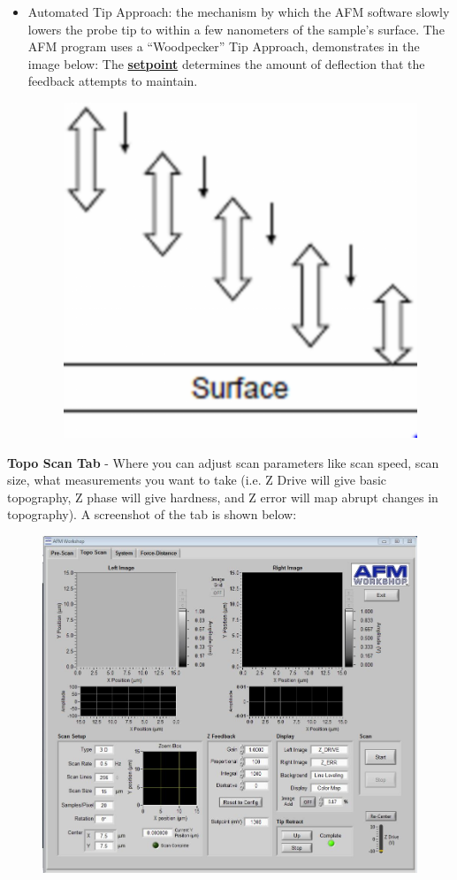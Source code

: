 \documentclass{../lab}
\begin{document}
\begin{itemize}
    \item Automated Tip Approach:  the mechanism by which the AFM software slowly lowers the probe tip to within a few nanometers of the sample's surface.  The AFM program uses a ``Woodpecker'' Tip Approach, demonstrates in the image below: The \href{http://experimentationlab.berkeley.edu/sites/default/files/AFMImages/VM\%203.3.\%20Avg\%20Dist\%20Control\_converted.mp4}{\textbf{setpoint}} determines the amount of deflection that the feedback attempts to maintain.
    \begin{figure}[h]
        \centering
        \href{http://experimentationlab.berkeley.edu/sites/default/files/AFMImages/AFMwoodpecker.png}{\includegraphics[width=0.5\linewidth]{images/AFMwoodpecker.png}}
        \label{fig:AFMwoodpecker}
    \end{figure}

\end{itemize}

\textbf{Topo Scan Tab} - Where you can adjust scan parameters like scan speed, scan size, what measurements you want to take (i.e. Z Drive will give basic topography, Z phase will give hardness, and Z error will map abrupt changes in topography).  A screenshot of the tab is shown below:

\begin{figure}[h]
    \centering
    \href{http://experimentationlab.berkeley.edu/sites/default/files/AFMImages/toposcan.JPG}{\includegraphics[width=0.5\linewidth]{images/toposcan.JPG}}
    \caption{}
    \label{fig:toposcan}
\end{figure}
\end{document}
